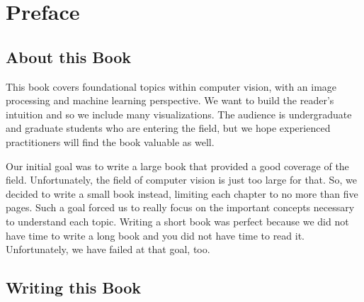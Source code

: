 \chapter*{Preface}


\section*{About this Book}

This book  covers foundational topics within computer vision, with an image processing and machine learning perspective. We want to build the reader's intuition and so we include many visualizations. The audience is undergraduate and graduate students who are entering the field, but we hope experienced practitioners will find the book valuable as well.  



Our initial goal was to write a large book that provided a good coverage of the field. Unfortunately, the field of computer vision is just too large for that.  So, we decided to write a small book instead, limiting each chapter to no more than five pages. Such a goal forced us to really focus on the important concepts necessary to understand each topic. Writing a short book was perfect because we did not have time to write a long book and you did not have time to read it. Unfortunately, we have failed at that goal, too. %

% 
\section*{Writing this Book}

